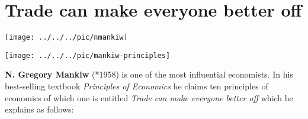 \section{Trade can make everyone better off}\label{sec:mankiw}	
\begin{minipage}{0.5\linewidth}	
	\begin{center}
		\texttt{[image: ../../../pic/nmankiw]}\label{fig:mankiw1}
	\end{center}
\end{minipage}
\begin{minipage}{0.5\linewidth}	
	\begin{center}
		\texttt{[image: ../../../pic/mankiw-principles]}\label{fig:mankiw2}
	\end{center}
\end{minipage}

\textbf{N. Gregory Mankiw }(*1958) is one of the most influential economists. In his best-selling textbook \textit{Principles of Economics} \citep[see][]{Mankiw2020Principles} he claims ten principles of economics of which one is entitled \textit{Trade can make everyone better off} which he explains as follows:

